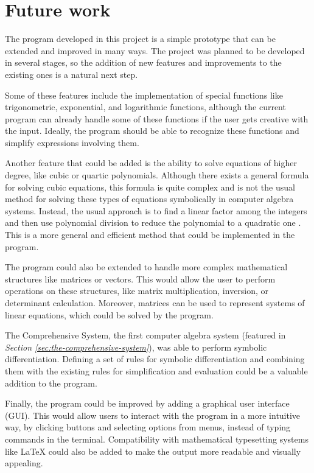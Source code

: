 \section{Future work}\label{sec:future-work}

The program developed in this project is a simple prototype that can be extended and improved in many ways. The project was planned to be developed in several stages, so the addition of new features and improvements to the existing ones is a natural next step.

Some of these features include the implementation of special functions like trigonometric, exponential, and logarithmic functions, although the current program can already handle some of these functions if the user gets creative with the input. Ideally, the program should be able to recognize these functions and simplify expressions involving them.

Another feature that could be added is the ability to solve equations of higher degree, like cubic or quartic polynomials. Although there exists a general formula for solving cubic equations, this formula is quite complex and is not the usual method for solving these types of equations symbolically in computer algebra systems. Instead, the usual approach is to find a linear factor among the integers and then use polynomial division to reduce the polynomial to a quadratic one \parencite{davenport1994computer}. This is a more general and efficient method that could be implemented in the program.

The program could also be extended to handle more complex mathematical structures like matrices or vectors. This would allow the user to perform operations on these structures, like matrix multiplication, inversion, or determinant calculation. Moreover, matrices can be used to represent systems of linear equations, which could be solved by the program.

The Comprehensive System, the first computer algebra system (featured in \textit{Section \ref{sec:the-comprehensive-system}}), was able to perform symbolic differentiation. Defining a set of rules for symbolic differentiation and combining them with the existing rules for simplification and evaluation could be a valuable addition to the program.

Finally, the program could be improved by adding a graphical user interface (GUI). This would allow users to interact with the program in a more intuitive way, by clicking buttons and selecting options from menus, instead of typing commands in the terminal. Compatibility with mathematical typesetting systems like \LaTeX{} could also be added to make the output more readable and visually appealing.

